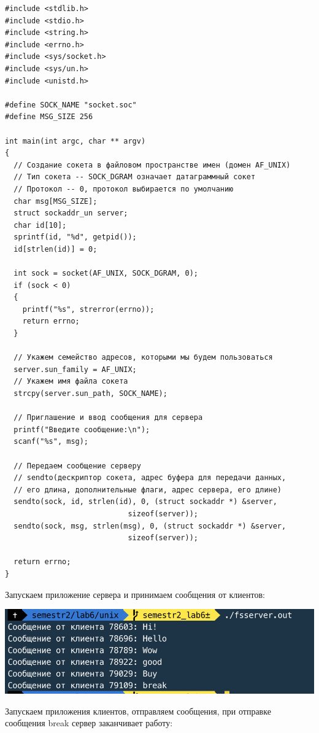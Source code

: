 \documentclass[a4paper,14pt]{extreport} %
\begin{document}
\begin{lstlisting}[caption=Код клиента]
#include <stdlib.h>
#include <stdio.h>
#include <string.h>
#include <errno.h>
#include <sys/socket.h>
#include <sys/un.h>
#include <unistd.h>

#define SOCK_NAME "socket.soc"
#define MSG_SIZE 256

int main(int argc, char ** argv)
{
  // Создание сокета в файловом пространстве имен (домен AF_UNIX)
  // Тип сокета -- SOCK_DGRAM означает датаграммный сокет
  // Протокол -- 0, протокол выбирается по умолчанию
  char msg[MSG_SIZE];
  struct sockaddr_un server;
  char id[10];
  sprintf(id, "%d", getpid());
  id[strlen(id)] = 0;

  int sock = socket(AF_UNIX, SOCK_DGRAM, 0);
  if (sock < 0)
  {
    printf("%s", strerror(errno));
    return errno;
  }

  // Укажем семейство адресов, которыми мы будем пользоваться
  server.sun_family = AF_UNIX;
  // Укажем имя файла сокета
  strcpy(server.sun_path, SOCK_NAME);

  // Приглашение и ввод сообщения для сервера
  printf("Введите сообщение:\n");
  scanf("%s", msg);

  // Передаем сообщение серверу
  // sendto(дескриптор сокета, адрес буфера для передачи данных, 
  // его длина, дополнительные флаги, адрес сервера, его длине)
  sendto(sock, id, strlen(id), 0, (struct sockaddr *) &server, 
  							sizeof(server));
  sendto(sock, msg, strlen(msg), 0, (struct sockaddr *) &server, 
  							sizeof(server));

  return errno;
}
\end{lstlisting}

Запускаем приложение сервера и принимаем сообщения от клиентов:

\includegraphics{server1}

\newpage

Запускаем приложения клиентов, отправляем сообщения, при отправке сообщения break сервер заканчивает работу:
\end{document}
